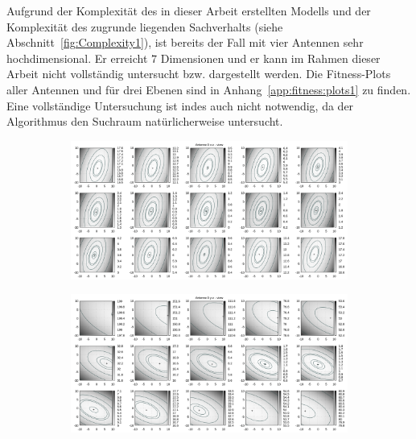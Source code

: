 Aufgrund der Komplexität des in dieser Arbeit erstellten Modells und der Komplexität des zugrunde liegenden Sachverhalts (siehe Abschnitt~\ref{fig:Complexity1}), ist bereits der Fall mit vier Antennen sehr hochdimensional. Er erreicht $7$ Dimensionen und er kann im Rahmen dieser Arbeit nicht vollständig untersucht bzw. dargestellt werden. Die Fitness-Plots aller Antennen und für drei Ebenen sind in Anhang~\ref{app:fitness:plots1} zu finden. Eine vollständige Untersuchung ist indes auch nicht notwendig, da der Algorithmus den Suchraum natürlicherweise untersucht. 
%
\begin{figure}[!h]
	 \caption[Übrige Ebenen für Antenne 1]{Auf diesen Abbildungen zeigen sich die Fitness-Ebenen für die übrigen Ansichten der Antenne 1, x-z und y-z. In der oberen Reihe sind Ebenen über den gesamten Bereich. Die Unteren zeigen eine vergrößerte Darstellung um das Minimum. Zu erkennen ist ein zum Verlauf der x-y-Ebene sehr ähnliches Bild. Ein flaches, längliches Tal mit Minimum. Die Dimension der x-Achse ist [m].} 
	 \label{fig:fitnessplanesA1}
     \centering
     \begin{subfigure}[t]{0.45\textwidth}
             \centering
             \includegraphics[width=\textwidth]{img/fitness/xz_a0.png}
     \end{subfigure}
     \qquad
     \begin{subfigure}[t]{0.45\textwidth}
			\centering
			\includegraphics[width=\textwidth]{img/fitness/yz_a0.png}

\end{subfigure}
\end{figure}
